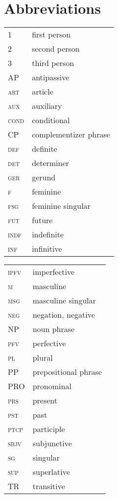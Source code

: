 \documentclass[output=paper,colorlinks,citecolor=brown]{langscibook}
\begin{document}
\section*{Abbreviations}
\begin{tabularx}{.45\textwidth}{lQ}
1 & first person\\
2 & second person\\
3 & third person\\
\textsc{AP} & antipassive \\
\textsc{art} & article \\
\textsc{aux} & auxiliary\\
\textsc{cond} & conditional\\
\textsc{CP} & complementizer phrase \\
\textsc{def} & definite\\
\textsc{det} & determiner\\
\textsc{ger} & gerund\\
\textsc{f} & feminine\\
\textsc{fsg} & feminine singular\\
\textsc{fut} & future\\
\textsc{indf} & indefinite\\
\textsc{inf} & infinitive\\
\end{tabularx}
\begin{tabularx}{.45\textwidth}{lQ}
\textsc{ipfv} & imperfective\\
\textsc{m} & masculine\\
\textsc{msg} & masculine singular\\
\textsc{neg} & negation, negative\\
\textsc{NP} & noun phrase \\
\textsc{pfv} & perfective\\
\textsc{pl} & plural\\
\textsc{PP} & prepositional phrase \\
\textsc{PRO} & pronominal \\
\textsc{prs} & present\\
\textsc{pst} & past\\
\textsc{ptcp} & participle\\
\textsc{sbjv} & subjunctive\\
\textsc{sg} & singular\\
\textsc{sup} & superlative\\
\textsc{TR} & transitive \\
\end{tabularx}
\end{document}
